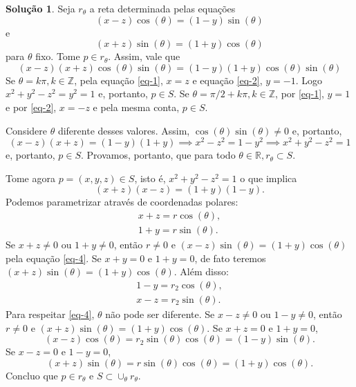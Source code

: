 \documentclass[a4paper,12pt]{article}
\newcommand{\R}{\mathbb{R}}
\theoremstyle{exer}
\theoremstyle{definition}
\newtheorem{solution}{Solução}
\theoremstyle{plain}
\begin{document}
\begin{solution}
    Seja $r_{\theta}$ a reta determinada pelas equações
    \begin{equation}
        \label{eq-1}
        (x - z)\cos(\theta) = (1 - y)\sin(\theta)
    \end{equation}
    e 
    \begin{equation}
        \label{eq-2}
        (x + z)\sin(\theta) = (1 + y)\cos(\theta)
    \end{equation}  
    para $\theta$ fixo. Tome $p \in r_{\theta}$. Assim, vale que 
    \begin{equation}
        \label{eq-3}
        (x - z)(x + z)\cos(\theta)\sin(\theta) = (1-y)(1+y)\cos(\theta)\sin(\theta)
    \end{equation}
    Se $\theta = k\pi, k \in \mathbb{Z}$, pela equação \ref{eq-1}, $x = z$ e
    equação \ref{eq-2}, $y=-1$. Logo $x^2 + y^2 -z^2 = y^2 = 1$ e, portanto,
    $p \in S$. Se $\theta = \pi/2 + k\pi, k \in \mathbb{Z}$, por \ref{eq-1},
    $y=1$ e por \ref{eq-2}, $x = -z$ e pela mesma conta, $p \in S$. 
    
    Considere $\theta$ diferente desses valores. Assim,
    $\cos(\theta)\sin(\theta) \neq 0$ e, portanto, 
    $$
    (x-z)(x+z) = (1 - y)(1 + y) \implies x^2 - z^2 = 1 - y^2 \implies x^2 + y^2 - z^2 = 1
    $$
    e, portanto, $p \in S$. Provamos, portanto, que para todo $\theta \in \R,
    r_{\theta} \subset S$. 

    Tome agora $p = (x,y,z) \in S$, isto é, $x^2 + y^2 - z^2 = 1$ o que
    implica
    \begin{equation}
        \label{eq-4}
        (x + z)(x - z) = (1 + y)(1 - y).
    \end{equation}
    Podemos parametrizar através de coordenadas polares:  
    \begin{align*}
        x + z = r\cos(\theta), \\
        1 + y = r\sin(\theta).
    \end{align*}
    Se $x + z \neq 0$ ou $1 + y \neq 0$, então $r \neq 0$ e $(x -
    z)\sin(\theta) = (1 + y)\cos(\theta)$ pela equação \ref{eq-4}. Se $x + y =
    0$ e $1 + y = 0$, de fato teremos $(x + z)\sin(\theta) = (1 +
    y)\cos(\theta)$. Além disso:
    \begin{align*}
        1 - y = r_2\cos(\theta), \\
        x - z = r_2\sin(\theta).
    \end{align*}
    Para respeitar \ref{eq-4}, $\theta$ não pode ser diferente. 
    Se $x - z \neq 0$ ou $1 - y \neq 0$, então $r \neq 0$ e $(x +
    z)\sin(\theta) = (1 + y)\cos(\theta)$. Se $x + z = 0$  e $1 + y = 0$, 
    $$
    (x-z)\cos(\theta) = r_2\sin(\theta)\cos(\theta) = (1-y)\sin(\theta).
    $$
    Se $x - z = 0$ e $1 - y = 0$, 
    $$
    (x+z)\sin(\theta) = r\sin(\theta)\cos(\theta) = (1+y)\cos(\theta).
    $$   
    Concluo que $p \in r_{\theta}$ e $S \subset \cup_{\theta} r_{\theta}$. 


\end{solution}
\end{document}
